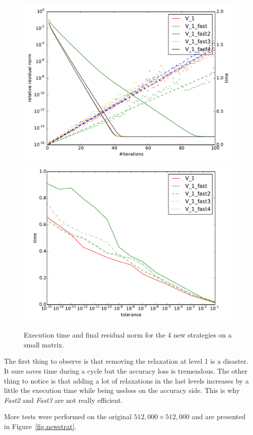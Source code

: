 \documentclass[a4paper,10pt]{article}
\begin{document}
  \begin{figure}
  \includegraphics[width=0.49\linewidth]{figs/convergence_fast_small.pdf}
   \includegraphics[width=0.49\linewidth]{figs/time_convergence_fast_small.pdf}
   \caption{Execution time and final residual norm for the 4 new strategies on a small matrix.}
   \label{fig.newstrat_small}
  \end{figure}

  The first thing to observe is that removing the relaxation at level 1 is a disaster. It sure saves time during a cycle but the accuracy loss is tremendous.
  The other thing to notice is that adding a lot of relaxations in the last levels increases by a little the execution time while being useless on the accuracy side. This is why \emph{Fast2} and  \emph{Fast3} are not really efficient.
  
  More tests were performed on the original $512,000\times 512,000$ and are presented in Figure~\ref{fig.newstrat}.
  
\end{document}
